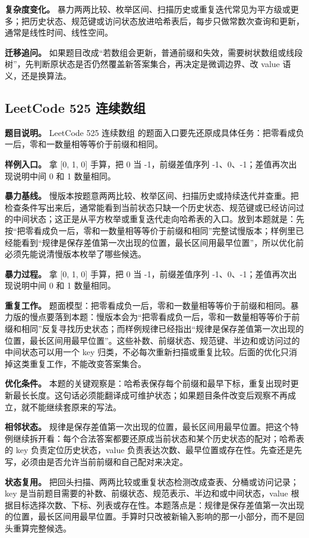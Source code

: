 \textbf{复杂度变化。} 暴力两两比较、枚举区间、扫描历史或重复迭代常见为平方级或更多；把历史状态、规范键或访问状态放进哈希表后，每步只做常数次查询和更新，通常是线性时间、线性空间。

\textbf{迁移追问。} 如果题目改成“若数组会更新，普通前缀和失效，需要树状数组或线段树”，先判断原状态是否仍然覆盖新答案集合，再决定是微调边界、改 value 语义，还是换算法。

\subsection{LeetCode 525 连续数组}

\textbf{题目说明。} LeetCode 525 连续数组 的题面入口要先还原成具体任务：把零看成负一后，零和一数量相等等价于前缀和相同。

\textbf{样例入口。} 拿 [0, 1, 0] 手算，把 0 当 -1，前缀差值序列 -1、0、-1；差值再次出现说明中间 0 和 1 数量相同。

\textbf{暴力基线。} 慢版本按题意两两比较、枚举区间、扫描历史或持续迭代并查重。把检查条件写出来后，通常能看到当前状态只缺一个历史状态、规范键或已经访问过的中间状态；这正是从平方枚举或重复迭代走向哈希表的入口。放到本题就是：先按“把零看成负一后，零和一数量相等等价于前缀和相同”完整试慢版本；样例里已经能看到“规律是保存差值第一次出现的位置，最长区间用最早位置”，所以优化前必须先能说清慢版本枚举了哪些候选。

\textbf{暴力过程。} 拿 [0, 1, 0] 手算，把 0 当 -1，前缀差值序列 -1、0、-1；差值再次出现说明中间 0 和 1 数量相同。

\textbf{重复工作。} 题面模型：把零看成负一后，零和一数量相等等价于前缀和相同。暴力版的慢点要落到本题：慢版本会为“把零看成负一后，零和一数量相等等价于前缀和相同”反复寻找历史状态；而样例规律已经指出“规律是保存差值第一次出现的位置，最长区间用最早位置”。这些补数、前缀状态、规范键、半边和或访问过的中间状态可以用一个 key 归类，不必每次重新扫描或重复比较。后面的优化只消掉这类重复工作，不能改变答案集合。

\textbf{优化条件。} 本题的关键观察是：哈希表保存每个前缀和最早下标，重复出现时更新最长长度。这句话必须能翻译成可维护状态；如果题目条件改变后观察不再成立，就不能继续套原来的写法。

\textbf{相邻状态。} 规律是保存差值第一次出现的位置，最长区间用最早位置。把这个特例继续拆开看：每个合法答案都要还原成当前状态和某个历史状态的配对；哈希表的 key 负责定位历史状态，value 负责表达次数、最早位置或存在性。先查还是先写，必须由是否允许当前前缀和自己配对来决定。

\textbf{状态复用。} 把回头扫描、两两比较或重复状态检测改成查表、分桶或访问记录；key 是当前题目需要的补数、前缀状态、规范表示、半边和或中间状态，value 根据目标选择次数、下标、列表或存在性。本题落点是：规律是保存差值第一次出现的位置，最长区间用最早位置。手算时只改被新输入影响的那一小部分，而不是回头重算完整候选。

